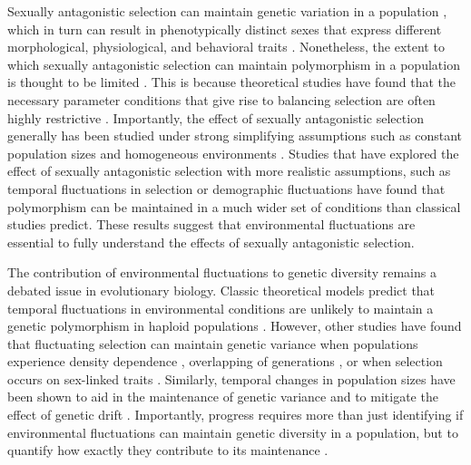 \documentclass[12pt]{article}
\begin{document}
Sexually antagonistic selection can maintain genetic variation in a population \citep{chippindale2001negative,gavrilets2014sexual}, which in turn can result in phenotypically distinct sexes that express different morphological, physiological, and behavioral traits \citep{mori2017sexual,connallon2018environmental}. Nonetheless,
the extent to which sexually antagonistic selection can maintain polymorphism in a population is thought to be limited \citep{connallon2012general,connallon2018environmental}. This is because theoretical studies have found that the necessary parameter conditions that give rise to balancing selection are often highly restrictive \citep{kidwell1977regions,pamilo1979genic,hedrick1999antagonistic,curtsinger1994antagonistic, patten2010fitness, jordan2012potential}. Importantly, the effect of sexually antagonistic selection generally has been studied under strong simplifying assumptions such as constant population sizes and homogeneous environments  \citep{kidwell1977regions, pamilo1979genic, immler2012ploidally, jordan2012potential}. Studies that have explored the effect of sexually antagonistic selection with more realistic assumptions, such as temporal fluctuations in selection \citep{connallon_evolutionary_2018} or demographic fluctuations \citep{connallon2012general} have found that polymorphism can be maintained in a much wider set of conditions than classical studies predict. These results suggest that environmental fluctuations are essential to fully understand the effects of sexually antagonistic selection.

The contribution of environmental fluctuations to genetic diversity remains a debated issue in evolutionary biology. Classic theoretical models predict that temporal fluctuations in environmental conditions are unlikely to maintain a genetic polymorphism in haploid populations \citep{dempster1955maintenance,hedrick1974genetic,hedrick1986genetic}. However, other studies have found that fluctuating selection can maintain genetic variance when populations experience density dependence \citep{dean2005protecting}, overlapping of generations \citep{ellner1994role, ellner1996patterns}, or when selection occurs on sex-linked traits \citep{reinhold2000maintenance}. Similarly, temporal changes in population sizes have been shown to aid in the maintenance of genetic variance \citep{whitlock1992temporal} and to mitigate the effect of genetic drift \citep{pemberton1996maintenance,nunney2002effective}. Importantly, progress requires more than just identifying if environmental fluctuations can maintain genetic diversity in a population, but to quantify how exactly they contribute to its maintenance \citep{ellner2016quantify}.
\end{document}
